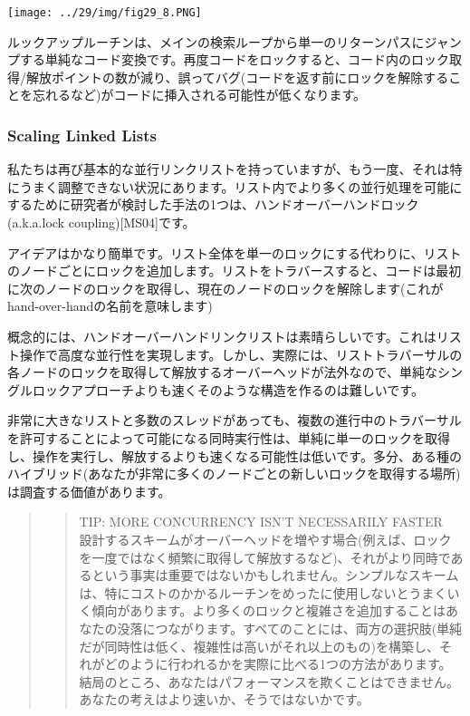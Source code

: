 \texttt{[image: ../29/img/fig29\_8.PNG]}

ルックアップルーチンは、メインの検索ループから単一のリターンパスにジャンプする単純なコード変換です。再度コードをロックすると、コード内のロック取得/解放ポイントの数が減り、誤ってバグ(コードを返す前にロックを解除することを忘れるなど)がコードに挿入される可能性が低くなります。

\hypertarget{scaling-linked-lists}{%
\subsubsection*{Scaling Linked Lists}\label{scaling-linked-lists}}

私たちは再び基本的な並行リンクリストを持っていますが、もう一度、それは特にうまく調整できない状況にあります。リスト内でより多くの並行処理を可能にするために研究者が検討した手法の1つは、ハンドオーバーハンドロック(a.k.a.lock
coupling){[}MS04{]}です。

アイデアはかなり簡単です。リスト全体を単一のロックにする代わりに、リストのノードごとにロックを追加します。リストをトラバースすると、コードは最初に次のノードのロックを取得し、現在のノードのロックを解除します(これがhand-over-handの名前を意味します)

概念的には、ハンドオーバーハンドリンクリストは素晴らしいです。これはリスト操作で高度な並行性を実現します。しかし、実際には、リストトラバーサルの各ノードのロックを取得して解放するオーバーヘッドが法外なので、単純なシングルロックアプローチよりも速くそのような構造を作るのは難しいです。

非常に大きなリストと多数のスレッドがあっても、複数の進行中のトラバーサルを許可することによって可能になる同時実行性は、単純に単一のロックを取得し、操作を実行し、解放するよりも速くなる可能性は低いです。多分、ある種のハイブリッド(あなたが非常に多くのノードごとの新しいロックを取得する場所)は調査する価値があります。

\begin{quote}
\begin{quote}
TIP: MORE CONCURRENCY ISN'T NECESSARILY FASTER\\
設計するスキームがオーバーヘッドを増やす場合(例えば、ロックを一度ではなく頻繁に取得して解放するなど)、それがより同時であるという事実は重要ではないかもしれません。シンプルなスキームは、特にコストのかかるルーチンをめったに使用しないとうまくいく傾向があります。より多くのロックと複雑さを追加することはあなたの没落につながります。すべてのことには、両方の選択肢(単純だが同時性は低く、複雑性は高いがそれ以上のもの)を構築し、それがどのように行われるかを実際に比べる1つの方法があります。結局のところ、あなたはパフォーマンスを欺くことはできません。あなたの考えはより速いか、そうではないかです。
\end{quote}
\end{quote}

